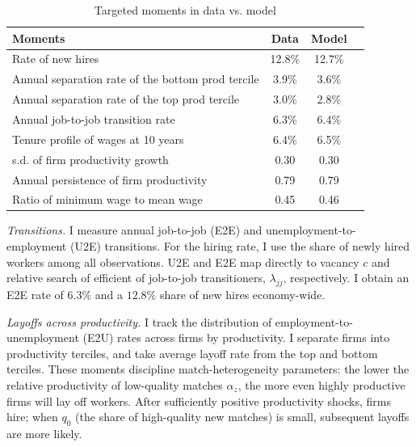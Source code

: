 \begin{table}
\centering
\begin{tabular}{lccc}
\hline
Moments & Data & Model \\
\hline
\hline
Rate of new hires &   12.8\%    & 12.7\%  \\
Annual separation rate of the bottom prod tercile &  3.9\% & 3.6\%\\
Annual separation rate of the top prod tercile &  3.0\% & 2.8\%\\
Annual job-to-job transition rate & 6.3\%   & 6.4\%  \\
Tenure profile of wages at 10 years &  6.4\%    & 6.5\% \\
s.d. of firm productivity growth & 0.30     &  0.30 \\
Annual persistence of firm productivity & 0.79  &  0.79 \\
Ratio of minimum wage to mean wage      &  0.45 &  0.46 \\
\hline
\end{tabular}
\caption{Targeted moments in data vs. model}
  \label{tab:moments}
\end{table}

\emph{Transitions.} I measure annual job-to-job (E2E) and unemployment-to-employment (U2E) transitions. For the hiring rate, I use the share of newly hired workers among all observations. U2E and E2E map directly to vacancy $c$ and relative search of efficient of job-to-job transitioners, $\lambda_{jj}$, respectively. I obtain an E2E rate of $6.3\%$ and a $12.8\%$ share of new hires economy-wide.

\emph{Layoffs across productivity.} I track the distribution of employment-to-unemployment (E2U) rates across firms by productivity. I separate firms into productivity terciles, and take average layoff rate from the top and bottom terciles. These moments discipline match-heterogeneity parameters: the lower the relative productivity of low-quality matches $\alpha_z$, the more even highly productive firms will lay off workers. After sufficiently positive productivity shocks, firms hire; when $q_0$ (the share of high-quality new matches) is small, subsequent layoffs are more likely.

